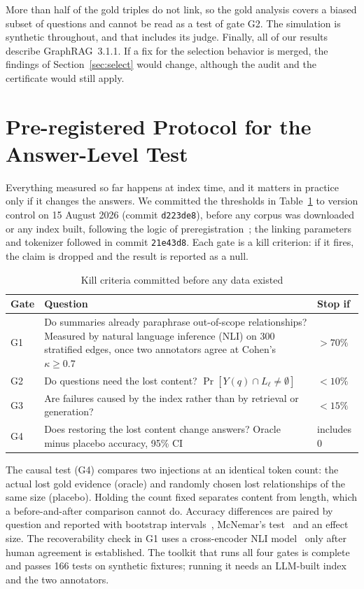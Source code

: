 \documentclass[journal]{IEEEtran}
\theoremstyle{remark}
\begin{document}
More than half of the gold triples do not link, so the gold analysis covers a biased subset of questions and cannot be read as a test of gate G2. The simulation is synthetic throughout, and that includes its judge. Finally, all of our results describe GraphRAG~3.1.1. If a fix for the selection behavior is merged, the findings of Section~\ref{sec:select} would change, although the audit and the certificate would still apply.

\section{Pre-registered Protocol for the Answer-Level Test}\label{sec:protocol}

Everything measured so far happens at index time, and it matters in practice only if it changes the answers. We committed the thresholds in Table~\ref{tab:gates} to version control on 15 August 2026 (commit \texttt{d223de8}), before any corpus was downloaded or any index built, following the logic of preregistration~\cite{nosek2018prereg}; the linking parameters and tokenizer followed in commit \texttt{21e43d8}. Each gate is a kill criterion: if it fires, the claim is dropped and the result is reported as a null.

\begin{table}[!htbp]
\caption{Kill criteria committed before any data existed}\label{tab:gates}
\centering\footnotesize
\begin{tabular}{@{}lp{4.3cm}l@{}}
\toprule
Gate & Question & Stop if \\
\midrule
G1 & Do summaries already paraphrase out-of-scope relationships? Measured by natural language inference (NLI) on 300 stratified edges, once two annotators agree at Cohen's $\kappa\ge0.7$~\cite{cohen1960kappa} & $>70\%$ \\
G2 & Do questions need the lost content? $\Pr[Y(q)\cap L_\ell\ne\emptyset]$ & $<10\%$ \\
G3 & Are failures caused by the index rather than by retrieval or generation? & $<15\%$ \\
G4 & Does restoring the lost content change answers? Oracle minus placebo accuracy, 95\% CI & includes 0 \\
\bottomrule
\end{tabular}
\end{table}

The causal test (G4) compares two injections at an identical token count: the actual lost gold evidence (oracle) and randomly chosen lost relationships of the same size (placebo). Holding the count fixed separates content from length, which a before-and-after comparison cannot do. Accuracy differences are paired by question and reported with bootstrap intervals~\cite{efron1979bootstrap}, McNemar's test~\cite{mcnemar1947} and an effect size. The recoverability check in G1 uses a cross-encoder NLI model~\cite{he2021deberta} only after human agreement is established. The toolkit that runs all four gates is complete and passes 166 tests on synthetic fixtures; running it needs an LLM-built index and the two annotators.
\end{document}
